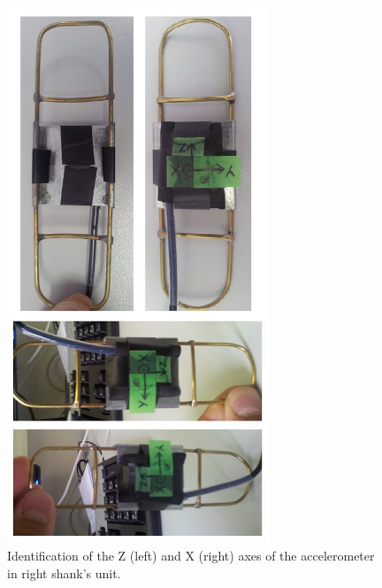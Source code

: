 \begin{figure}[H]
\centering
\includegraphics[width=0.7\textwidth]{figures/thighShankAccs.jpg}
\caption{Identification of the Z (left) and X (right) axes of the accelerometer in right shank's unit.}
\label{fig:thighShankAccs}
\end{figure}

